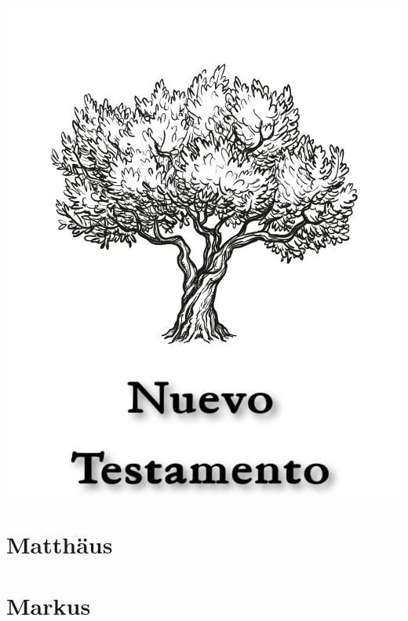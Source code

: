 \null\vfill
\begin{center}
\begin{minipage}[c]{\textwidth}
  \begin{center}
  \includegraphics{NuevoTestamentoTitulo.pdf}
  \end{center}
\end{minipage}
\end{center}
\null\vfill
\newpage

\pagestyle{bible}

\chapter{Matthäus}
\begin{multicols}{2}
  \raggedcolumns
  \parskip=0pt \relax
  
\end{multicols}

\chapter{Markus}
\begin{multicols}{2}
  \raggedcolumns
  \parskip=0pt \relax
  
\end{multicols}

